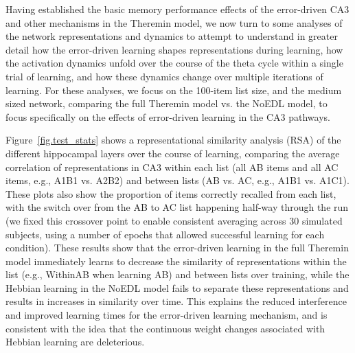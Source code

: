 \documentclass[11pt,twoside]{article}
\newif\myifpdf
\begin{document}
Having established the basic memory performance effects of the error-driven CA3 and other mechanisms in the Theremin model, we now turn to some analyses of the network representations and dynamics to attempt to understand in greater detail how the error-driven learning shapes representations during learning, how the activation dynamics unfold over the course of the theta cycle within a single trial of learning, and how these dynamics change over multiple iterations of learning.  For these analyses, we focus on the 100-item list size, and the medium sized network, comparing the full Theremin model vs. the NoEDL model, to focus specifically on the effects of error-driven learning in the CA3 pathways.

Figure~\ref{fig.test_stats} shows a representational similarity analysis (RSA) of the different hippocampal layers over the course of learning, comparing the average correlation of representations in CA3 within each list (all AB items and all AC items, e.g., A1B1 vs. A2B2) and between lists (AB vs. AC, e.g., A1B1 vs. A1C1).  These plots also show the proportion of items correctly recalled from each list, with the switch over from the AB to AC list happening half-way through the run (we fixed this crossover point to enable consistent averaging across 30 simulated subjects, using a number of epochs that allowed successful learning for each condition).  These results show that the error-driven learning in the full Theremin model immediately learns to decrease the similarity of representations within the list (e.g., WithinAB when learning AB) and between lists over training, while the Hebbian learning in the NoEDL model fails to separate these representations and results in increases in similarity over time.  This explains the reduced interference and improved learning times for the error-driven learning mechanism, and is consistent with the idea that the continuous weight changes associated with Hebbian learning are deleterious.
\end{document}
